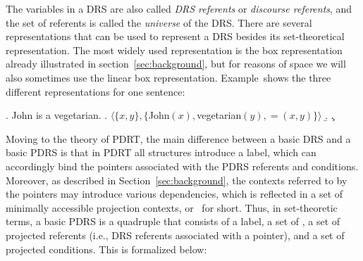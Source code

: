 \noindent The variables in a DRS are also called \textit{DRS referents} or
\textit{discourse referents}, and the set of referents is called the
\textit{universe} of the DRS.  There are several representations that can be
used to represent a DRS besides its set-theoretical representation. The most
widely used representation is the box representation already illustrated in
section~\ref{sec:background}, but for reasons of space we will also
sometimes use the linear box representation. Example~\Next shows the three
different representations for one sentence:

\ex. John is a vegetarian.
\a. $\langle \{x, y\},\{$John$(x),$vegetarian$(y), =(x,y)\}\rangle$
\b. 
\c. 

Moving to the theory of PDRT, the main difference between a basic DRS and
a basic PDRS is that in PDRT all structures introduce a label, which can
accordingly bind the pointers associated with the PDRS referents and
conditions.  Moreover, as described in Section~\ref{sec:background}, the contexts
referred to by the pointers may introduce various dependencies, which is
reflected in a set of minimally accessible projection contexts, or \MAPs~for
short.  Thus, in set-theoretic terms, a basic PDRS is a quadruple that
consists of a label, a set of \MAPs, a set of projected referents (i.e., DRS
referents associated with a pointer), and a set of projected conditions.
This is formalized below:

